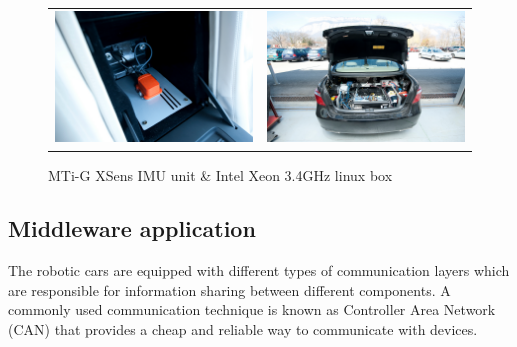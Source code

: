 \begin{figure}[h]
   \centering
     \begin{tabular}{lr}
       \includegraphics[width=0.45\columnwidth]{img/testbed:xsens}
       & \includegraphics[width=0.45\columnwidth]{img/testbed:trunc}
     \end{tabular}
   \caption{MTi-G XSens IMU unit \& Intel Xeon 3.4GHz linux box}
   \label{fig:Lexus2}
 \end{figure}





\subsection{Middleware application}

The robotic cars are equipped with different types of communication layers which are responsible for information sharing between different components. A commonly used communication technique is known as Controller Area Network (CAN) \cite{bosch91can} that provides a cheap and reliable way to communicate with devices.%

